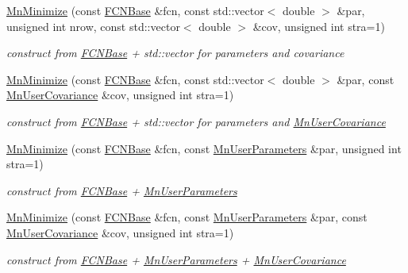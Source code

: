 \begin{DoxyCompactItemize}
\mbox{\hyperlink{classROOT_1_1Minuit2_1_1MnMinimize_ad6015768309e01c6610185006008b2d5}{Mn\+Minimize}} (const \mbox{\hyperlink{classROOT_1_1Minuit2_1_1FCNBase}{F\+C\+N\+Base}} \&fcn, const std\+::vector$<$ double $>$ \&par, unsigned int nrow, const std\+::vector$<$ double $>$ \&cov, unsigned int stra=1)
\begin{DoxyCompactList}\small\item\em construct from \mbox{\hyperlink{classROOT_1_1Minuit2_1_1FCNBase}{F\+C\+N\+Base}} + std\+::vector for parameters and covariance \end{DoxyCompactList}\item 
\mbox{\hyperlink{classROOT_1_1Minuit2_1_1MnMinimize_a4cf2e37839cc454720ab3bd8041dffa9}{Mn\+Minimize}} (const \mbox{\hyperlink{classROOT_1_1Minuit2_1_1FCNBase}{F\+C\+N\+Base}} \&fcn, const std\+::vector$<$ double $>$ \&par, const \mbox{\hyperlink{classROOT_1_1Minuit2_1_1MnUserCovariance}{Mn\+User\+Covariance}} \&cov, unsigned int stra=1)
\begin{DoxyCompactList}\small\item\em construct from \mbox{\hyperlink{classROOT_1_1Minuit2_1_1FCNBase}{F\+C\+N\+Base}} + std\+::vector for parameters and \mbox{\hyperlink{classROOT_1_1Minuit2_1_1MnUserCovariance}{Mn\+User\+Covariance}} \end{DoxyCompactList}\item 
\mbox{\hyperlink{classROOT_1_1Minuit2_1_1MnMinimize_a0d930638a3d23f7ca1a8dc3f016a4730}{Mn\+Minimize}} (const \mbox{\hyperlink{classROOT_1_1Minuit2_1_1FCNBase}{F\+C\+N\+Base}} \&fcn, const \mbox{\hyperlink{classROOT_1_1Minuit2_1_1MnUserParameters}{Mn\+User\+Parameters}} \&par, unsigned int stra=1)
\begin{DoxyCompactList}\small\item\em construct from \mbox{\hyperlink{classROOT_1_1Minuit2_1_1FCNBase}{F\+C\+N\+Base}} + \mbox{\hyperlink{classROOT_1_1Minuit2_1_1MnUserParameters}{Mn\+User\+Parameters}} \end{DoxyCompactList}\item 
\mbox{\hyperlink{classROOT_1_1Minuit2_1_1MnMinimize_a0f9bbcbd7bd87cb2f613f8d01ef49d86}{Mn\+Minimize}} (const \mbox{\hyperlink{classROOT_1_1Minuit2_1_1FCNBase}{F\+C\+N\+Base}} \&fcn, const \mbox{\hyperlink{classROOT_1_1Minuit2_1_1MnUserParameters}{Mn\+User\+Parameters}} \&par, const \mbox{\hyperlink{classROOT_1_1Minuit2_1_1MnUserCovariance}{Mn\+User\+Covariance}} \&cov, unsigned int stra=1)
\begin{DoxyCompactList}\small\item\em construct from \mbox{\hyperlink{classROOT_1_1Minuit2_1_1FCNBase}{F\+C\+N\+Base}} + \mbox{\hyperlink{classROOT_1_1Minuit2_1_1MnUserParameters}{Mn\+User\+Parameters}} + \mbox{\hyperlink{classROOT_1_1Minuit2_1_1MnUserCovariance}{Mn\+User\+Covariance}} \end{DoxyCompactList}\item 

\end{DoxyCompactItemize}
